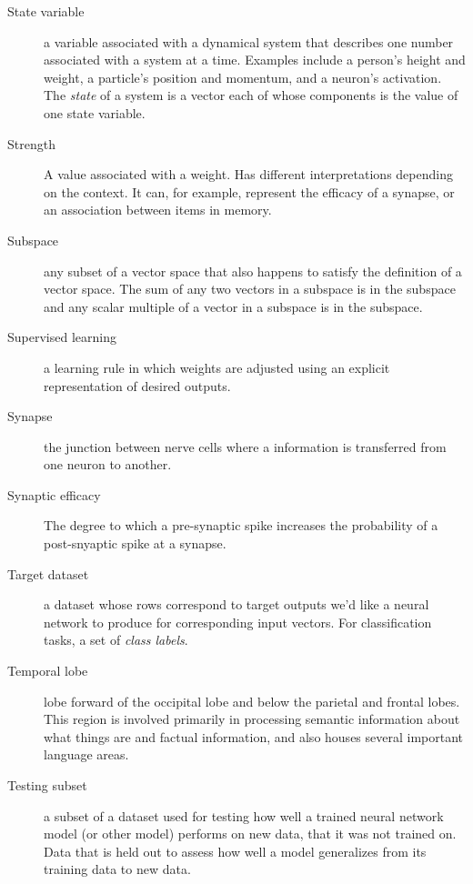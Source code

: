 \begin{description}
\item[State variable] a variable associated with a dynamical system that describes one number associated with a system at a time. Examples include a person's height and weight, a particle's position and momentum, and a neuron's activation. The \emph{state} of a system is a vector each of whose components is the value of one state variable. 


\item[Strength] A value associated with a weight. Has different interpretations depending on the context. It can, for example, represent the efficacy of a synapse, or an association between items in memory.


\item[Subspace] any subset of a vector space that also happens to satisfy the definition of a vector space. The sum of any two vectors in a subspace is in the subspace and any scalar multiple of a vector in a subspace is in the subspace.

\item[Supervised learning] a learning rule in which weights are adjusted using an explicit representation of desired outputs.


\item[Synapse] the junction between nerve cells where a information is transferred from one neuron to another.

\item[Synaptic efficacy] The degree to which a pre-synaptic spike increases the probability of a post-snyaptic spike at a synapse.

\item[Target dataset] a dataset whose rows correspond to target outputs we'd like a neural network to produce for corresponding input vectors. For classification tasks, a set of \emph{class labels}.

\item[Temporal lobe] lobe forward of the occipital lobe and below the parietal and frontal lobes. This region is involved primarily in processing semantic information about what things are and factual information, and also houses several important language areas.

\item[Testing subset] a subset of a dataset used for testing how well a trained neural network model (or other model) performs on new data, that it was not trained on. Data that is held out to assess how well a model generalizes from its training data to new data.


\end{description}
